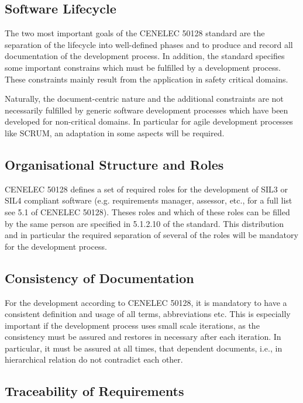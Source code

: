 
\subsection{Software Lifecycle}
\label{sec:software-lifecycle}

The two most important goals of the CENELEC 50128 standard are the separation of
the lifecycle into well-defined phases and to produce and record all
documentation of the development process. In addition, the standard specifies
some important constrains which must be fulfilled by a development
process. These constraints mainly result from the application in safety critical
domains.

Naturally, the document-centric nature and the additional constraints are not
necessarily fulfilled by generic software development processes which have been
developed for non-critical domains. In particular for agile development
processes like SCRUM, an adaptation in some aspects will be required.

\subsection{Organisational Structure and Roles}
\label{sec:organ-struct-roles}

CENELEC 50128 defines a set of required roles for the development of SIL3 or
SIL4 compliant software (e.g. requirements manager, assessor, etc., for a full
list see 5.1 of CENELEC 50128). Theses roles and which of these roles can be
filled by the same person are specified in 5.1.2.10 of the standard. This
distribution and in particular the required separation of several of the roles
will be mandatory for the development process.


\subsection{Consistency of Documentation}
\label{sec:cons-docum}

For the development according to CENELEC 50128, it is mandatory to have a
consistent definition and usage of all terms, abbreviations etc. This is
especially important if the development process uses small scale iterations, as
the consistency must be assured and restores in necessary after each
iteration. In particular, it must be assured at all times, that dependent
documents, i.e., in hierarchical relation do not contradict each other.

\subsection{Traceability of Requirements}
\label{sec:trac-requ}

